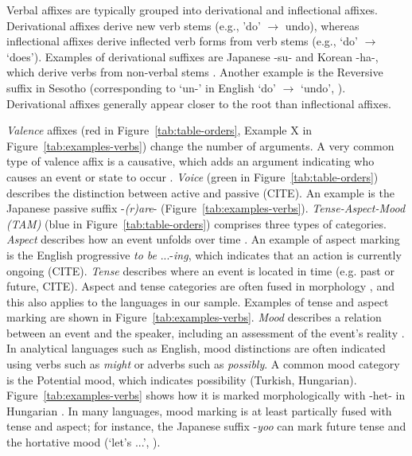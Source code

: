 \documentclass[11pt,letterpaper]{article}
\begin{document}
Verbal affixes are typically grouped into derivational and inflectional affixes.
Derivational affixes derive new verb stems (e.g., 'do' $\rightarrow$ undo), whereas inflectional affixes derive inflected verb forms from verb stems (e.g., `do' $\rightarrow$ `does').
Examples of derivational suffixes are Japanese -su- and Korean -ha-, which derive verbs from non-verbal stems \citep{hasegawa2014japanese, yeon2010korean}.
Another example is the Reversive suffix in Sesotho (corresponding to `un-' in English `do' $\rightarrow$ `undo', \citep{doke1967textbook}).
Derivational affixes generally appear closer to the root than inflectional affixes.

\textit{Valence} affixes (red in Figure~\ref{tab:table-orders}, Example X in Figure~\ref{tab:examples-verbs}) change the number of arguments. A very common type of valence affix is a causative, which adds an argument indicating who causes an event or state to occur \citep{wals-111}.
\textit{Voice} (green in Figure~\ref{tab:table-orders}) describes the distinction between active and passive (CITE). An example is the Japanese passive suffix -\textit{(r)are}- (Figure~\ref{tab:examples-verbs}).
\textit{Tense-Aspect-Mood (TAM)} (blue in Figure~\ref{tab:table-orders}) comprises three types of categories.
\textit{Aspect} describes how an event unfolds over time \citep{comrie1976aspect,dahl1985tense,binnick1991time}.
An example of aspect marking is the English progressive \textit{to be} ...-\textit{ing}, which indicates that an action is currently ongoing (CITE).
\textit{Tense} describes where an event is located in time (e.g. past or future, CITE).
Aspect and tense categories are often fused in morphology \citep{binnick2012the}, and this also applies to the languages in our sample.
Examples of tense and aspect marking are shown in Figure~\ref{tab:examples-verbs}.
\textit{Mood} describes a relation between an event and the speaker, including an assessment of the event's reality \cite{palmer1986mood,portner2018mood}.
In analytical languages such as English, mood distinctions are often indicated using verbs such as \textit{might} or adverbs such as \textit{possibly}.
A common mood category is the Potential mood, which indicates possibility (Turkish, Hungarian).
Figure~\ref{tab:examples-verbs} shows how it is marked morphologically with -het- in Hungarian \citep{rounds2001hungarian}.
In many languages, mood marking is at least partically fused with tense and aspect; for instance, the Japanese suffix -\textit{yoo} can mark future tense and the hortative mood (`let's ...', \citep{hasegawa2014japanese}).
\end{document}
